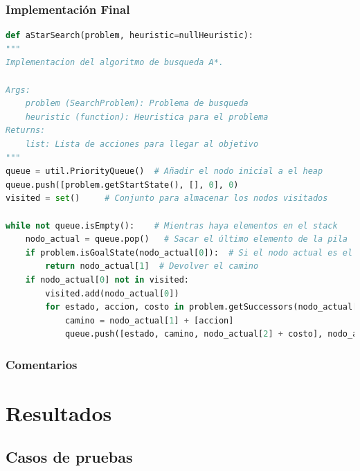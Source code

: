 \documentclass{report}
\begin{document}
        \subsection*{Implementación Final}
          \begin{lstlisting}[language=Python, caption=Implementación final del A*]
def aStarSearch(problem, heuristic=nullHeuristic):
"""
Implementacion del algoritmo de busqueda A*.

Args:
    problem (SearchProblem): Problema de busqueda
    heuristic (function): Heuristica para el problema
Returns:
    list: Lista de acciones para llegar al objetivo
"""
queue = util.PriorityQueue()  # Añadir el nodo inicial a el heap
queue.push([problem.getStartState(), [], 0], 0)
visited = set()     # Conjunto para almacenar los nodos visitados

while not queue.isEmpty():    # Mientras haya elementos en el stack
    nodo_actual = queue.pop()   # Sacar el último elemento de la pila
    if problem.isGoalState(nodo_actual[0]):  # Si el nodo actual es el objetivo
        return nodo_actual[1]  # Devolver el camino
    if nodo_actual[0] not in visited:
        visited.add(nodo_actual[0])
        for estado, accion, costo in problem.getSuccessors(nodo_actual[0]): # Añadir los hijos del nodo actual a la pila
            camino = nodo_actual[1] + [accion]
            queue.push([estado, camino, nodo_actual[2] + costo], nodo_actual[2] + costo + heuristic(estado, problem))        
          \end{lstlisting}
        \subsection*{Comentarios}
          \paragraph*{}{
          }
    \chapter{Resultados}
      \section{Casos de pruebas}
\end{document}
